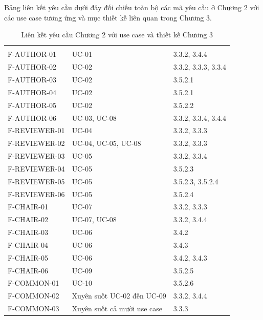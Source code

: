 Bảng liên kết yêu cầu dưới đây đối chiếu toàn bộ các mã yêu cầu ở Chương 2 với các use case tương ứng và mục thiết kế liên quan trong Chương 3.


\begingroup
\setlength{\tabcolsep}{2pt}
\renewcommand{\arraystretch}{1.15}
\begin{longtable}{|P{0.29\textwidth}|P{0.30\textwidth}|P{0.35\textwidth}|}
  \caption{Liên kết yêu cầu Chương 2 với use case và thiết kế Chương 3}\\
  \hline
       &        &     \\ \hline
  \endfirsthead
  \hline
       &        &     \\ \hline
  \endhead
  F-AUTHOR-01   &   UC-01   &   3.3.2, 3.4.4 \\ \hline
  F-AUTHOR-02      &      UC-02      &      3.3.2, 3.3.3, 3.3.4 \\ \hline
  F-AUTHOR-03     &     UC-02     &     3.5.2.1 \\ \hline
  F-AUTHOR-04      &      UC-02      &      3.5.2.1 \\ \hline
  F-AUTHOR-05     &     UC-02     &     3.5.2.2 \\ \hline
  F-AUTHOR-06      &      UC-03, UC-08      &      3.3.2, 3.3.4, 3.4.4 \\ \hline
  F-REVIEWER-01     &     UC-04     &     3.3.2, 3.3.3 \\ \hline
  F-REVIEWER-02      &      UC-04, UC-05, UC-08      &      3.3.2, 3.3.3 \\ \hline
  F-REVIEWER-03     &     UC-05     &     3.3.2, 3.3.4 \\ \hline
  F-REVIEWER-04      &      UC-05      &      3.5.2.3 \\ \hline
  F-REVIEWER-05     &     UC-05     &     3.5.2.3, 3.5.2.4 \\ \hline
  F-REVIEWER-06     &     UC-05     &     3.5.2.4 \\ \hline
  F-CHAIR-01      &      UC-07      &      3.3.2, 3.3.3 \\ \hline
  F-CHAIR-02     &     UC-07, UC-08     &     3.3.2, 3.4.4 \\ \hline
  F-CHAIR-03      &      UC-06      &      3.4.2 \\ \hline
  F-CHAIR-04     &     UC-06     &     3.4.3 \\ \hline
  F-CHAIR-05      &      UC-06      &      3.4.2, 3.4.3 \\ \hline
  F-CHAIR-06      &      UC-09      &      3.5.2.5 \\ \hline
  F-COMMON-01     &     UC-10     &     3.5.2.6 \\ \hline
  F-COMMON-02      &      Xuyên suốt UC-02 đến UC-09      &      3.3.2, 3.4.4 \\ \hline
  F-COMMON-03     &     Xuyên suốt cả mười use case     &     3.3.3 \\ \hline
\end{longtable}
\endgroup

